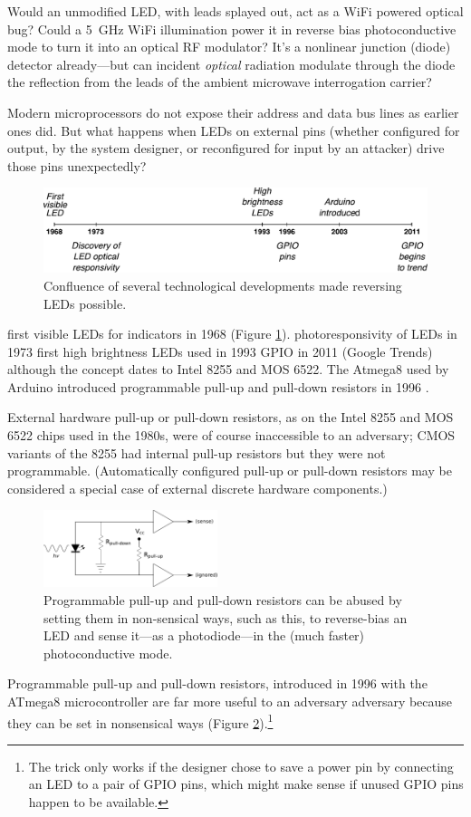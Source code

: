 \documentclass[a4paper,twoside,11pt]{book}
\begin{document}
Would an unmodified LED, with leads splayed out, act as a WiFi powered
optical bug? Could a \SI{5}{\giga\hertz} WiFi illumination power it in
reverse bias photoconductive mode to turn it into an optical RF
modulator? It's a nonlinear junction (diode) detector already---but can
incident \emph{optical} radiation modulate through the diode the reflection
from the leads of the ambient microwave interrogation carrier?

Modern microprocessors do not expose their address and data bus lines as
earlier ones did. But what happens when LEDs on external pins (whether
configured for output, by the system designer, or reconfigured for input by an
attacker) drive those pins unexpectedly?
\begin{figure}[ht]
  \centering
  \includegraphics[width=\textwidth]{timeline.pdf}
  \caption{Confluence of several technological developments made reversing LEDs
    possible.}
  \label{figure:timeline}
\end{figure}
first visible LEDs for indicators in 1968 (Figure \ref{figure:timeline}).
photoresponsivity of LEDs in 1973
first high brightness LEDs used in 1993
GPIO in 2011 (Google Trends) although the concept dates to Intel 8255 and MOS
6522. The Atmega8 used by Arduino introduced programmable pull-up and pull-down
resistors in 1996 \cite{Mims1973b,Atmel2013,Stringfellow1997}.

External hardware pull-up or pull-down resistors, as on the Intel 8255 and MOS
6522 chips used in the 1980s, were of course inaccessible to an adversary; CMOS
variants of the 8255 had internal pull-up resistors but they were not
programmable. (Automatically configured pull-up or pull-down resistors may be
considered a special case of external discrete hardware components.)
\begin{figure}[ht]
  \centering
  \includegraphics[width=2in]{nonsensical.pdf}
  \caption{Programmable pull-up and pull-down resistors can be abused by
    setting them in non-sensical ways, such as this, to reverse-bias an LED
    and sense it---as a photodiode---in the (much faster) photoconductive
    mode.}
  \label{figure:nonsensical}
\end{figure}
Programmable pull-up and pull-down resistors, introduced in 1996 with the
ATmega8 microcontroller \cite{Atmel2013} are far more useful to an adversary
adversary because they can be set in nonsensical ways (Figure
\ref{figure:nonsensical}).\footnote{The trick only works if the designer chose
to save a power pin by connecting an LED to a pair of GPIO pins, which might
make sense if unused GPIO pins happen to be available.}
\end{document}
